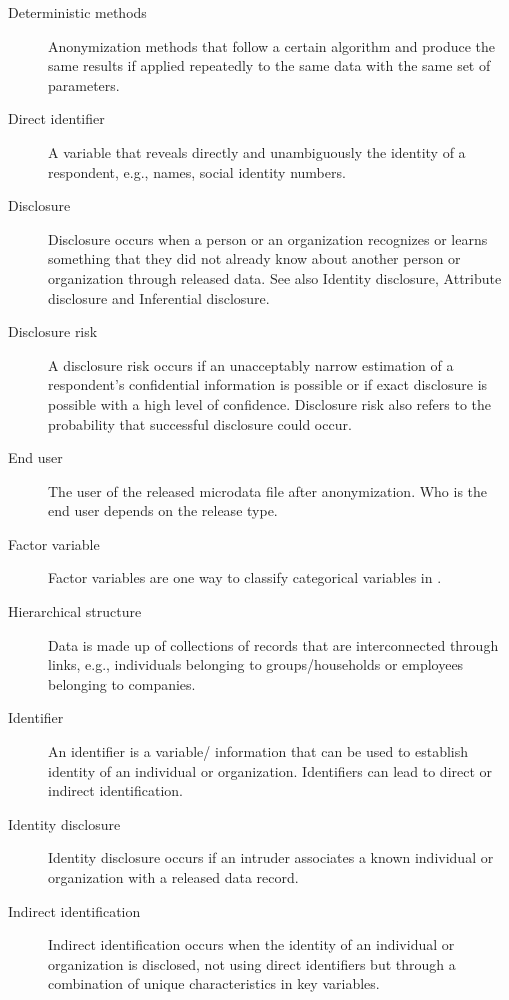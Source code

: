\documentclass[letterpaper,10pt,english]{sphinxmanual}
\begin{document}
\begin{description}
\item[{Deterministic methods}] \leavevmode
Anonymization methods that follow a certain algorithm and produce
the same results if applied repeatedly to the same data with  the same set of parameters.

\item[{Direct identifier}] \leavevmode
A variable that reveals directly  and unambiguously the identity of a respondent,
e.g., names, social identity numbers.

\item[{Disclosure}] \leavevmode
Disclosure occurs when a person   or an organization recognizes or
learns something that they did not already know about another person
or organization through released data. \sphinxfootnotemark[1]
See also Identity disclosure,  Attribute disclosure and  Inferential disclosure.

\item[{Disclosure risk}] \leavevmode
A disclosure risk occurs if an unacceptably narrow estimation of a respondent’s
confidential information is possible or if  exact disclosure is possible with a high level of
confidence. \sphinxfootnotemark[2]  Disclosure risk also refers to the probability that successful
disclosure could occur.

\item[{End user}] \leavevmode
The user of the released  microdata file after   anonymization. Who is the end
user depends on the release type.

\item[{Factor variable}] \leavevmode
Factor variables are one way to   classify categorical variables in .

\item[{Hierarchical structure}] \leavevmode
Data is made up of collections of records that are interconnected   through links,
e.g., individuals  belonging to groups/households or employees belonging to companies.

\item[{Identifier}] \leavevmode
An identifier is a variable/   information that can be used to   establish identity
of an  individual or organization. Identifiers can lead to direct or indirect identification.

\item[{Identity disclosure}] \leavevmode
Identity disclosure occurs if an  intruder associates a known individual or organization with a released data record.

\item[{Indirect identification}] \leavevmode
Indirect identification occurs when the identity of an   individual or organization is
disclosed, not using direct identifiers but through a combination of unique
characteristics in key  variables. \sphinxfootnotemark[1]


\end{description}
\end{document}
